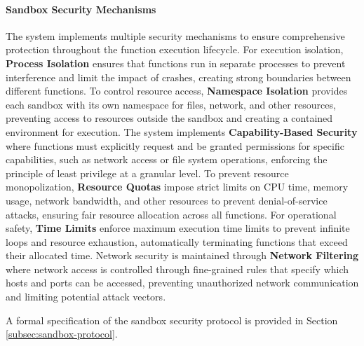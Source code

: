 \documentclass{article}
\begin{document}
\paragraph{Sandbox Security Mechanisms}
The system implements multiple security mechanisms to ensure comprehensive protection throughout the function execution lifecycle. For execution isolation, \textbf{Process Isolation} ensures that functions run in separate processes to prevent interference and limit the impact of crashes, creating strong boundaries between different functions. To control resource access, \textbf{Namespace Isolation} provides each sandbox with its own namespace for files, network, and other resources, preventing access to resources outside the sandbox and creating a contained environment for execution. The system implements \textbf{Capability-Based Security} where functions must explicitly request and be granted permissions for specific capabilities, such as network access or file system operations, enforcing the principle of least privilege at a granular level. To prevent resource monopolization, \textbf{Resource Quotas} impose strict limits on CPU time, memory usage, network bandwidth, and other resources to prevent denial-of-service attacks, ensuring fair resource allocation across all functions. For operational safety, \textbf{Time Limits} enforce maximum execution time limits to prevent infinite loops and resource exhaustion, automatically terminating functions that exceed their allocated time. Network security is maintained through \textbf{Network Filtering} where network access is controlled through fine-grained rules that specify which hosts and ports can be accessed, preventing unauthorized network communication and limiting potential attack vectors.

A formal specification of the sandbox security protocol is provided in Section \ref{subsec:sandbox-protocol}.


\end{document}
